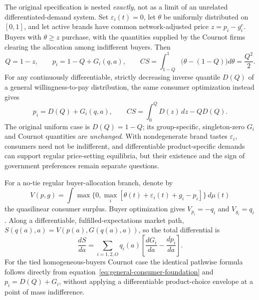 The original specification is nested \emph{exactly}, not as a
limit of an unrelated differentiated-demand system.  Set
\(\varepsilon_i(t)=0\), let \(\theta\) be uniformly distributed
on \([0,1]\), and let active brands have common
network-adjusted price \(z=p_i-g_i^e\).  Buyers with
\(\theta\ge z\) purchase, with the quantities supplied by
the Cournot firms clearing the allocation among indifferent
buyers.  Then
\[
 Q=1-z,\qquad p_i=1-Q+G_i(q,a),\qquad
 CS=\int_{1-Q}^{1}\bigl(\theta-(1-Q)\bigr)d\theta
 =\frac{Q^2}{2}.
\]
For any continuously differentiable, strictly decreasing inverse
quantile \(D(Q)\) of a general willingness-to-pay distribution,
the same consumer optimization instead gives
\begin{equation}
 p_i=D(Q)+G_i(q,a),\qquad
 CS=\int_0^Q D(z)\,dz-QD(Q).
 \label{eq:general-consumer-foundation}
\end{equation}
The original uniform case is \(D(Q)=1-Q\); its
group-specific, singleton-zero \(G_i\) and Cournot quantities
are \emph{unchanged}.  With nondegenerate brand tastes
\(\varepsilon_i\), consumers need not be indifferent,
and differentiable product-specific demands can support
regular price-setting equilibria, but their existence and
the sign of government preferences remain separate questions.

For a no-tie regular buyer-allocation branch, denote by
\[
 V(p,g)=\int\max\{0,\max_i[
   \theta(t)+\varepsilon_i(t)+g_i-p_i]\}\,d\mu(t)
\]
the quasilinear consumer surplus.  Buyer optimization gives
\(V_{p_i}=-q_i\) and \(V_{g_i}=q_i\).
Along a differentiable, fulfilled-expectations market path,
\(S(q(a),a)=V(p(a),G(q(a),a))\), so the total differential is
\begin{equation}
 \frac{dS}{da}
 =\sum_{i=1,2,O}q_i(a)
   \left[\frac{dG_i}{da}-\frac{dp_i}{da}\right].
 \label{eq:microfounded-consumer-envelope}
\end{equation}
For the tied homogeneous-buyers Cournot case the identical
pathwise formula follows directly from
equation~\eqref{eq:general-consumer-foundation} and
\(p_i=D(Q)+G_i\), without applying a differentiable
product-choice envelope at a point of mass indifference.

